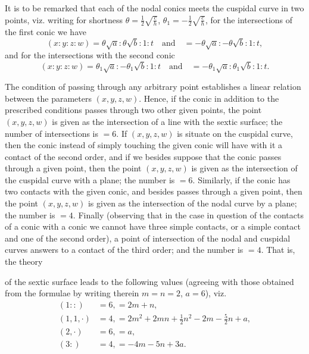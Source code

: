 \documentclass[12pt,a4paper]{article}
\begin{document}
It is to be remarked that each of the nodal conics meets the cuspidal curve in two points, viz. writing for shortness $\theta = \tfrac{1}{2}\sqrt{\tfrac{c}{h}}$, $\theta_1 = -\tfrac{1}{2}\sqrt{\tfrac{c}{h}}$, for the intersections of the first conic we have
\[
(x : y : z : w) = \theta\sqrt{a} : \theta\sqrt{b} : 1 : t \quad\text{and}\quad = -\theta\sqrt{a} : -\theta\sqrt{b} : 1 : t,
\]
and for the intersections with the second conic
\[
(x : y : z : w) = \theta_1\sqrt{a} : -\theta_1\sqrt{b} : 1 : t \quad\text{and}\quad = -\theta_1\sqrt{a} : \theta_1\sqrt{b} : 1 : t.
\]

The condition of passing through any arbitrary point establishes a linear relation between the parameters $(x, y, z, w)$. Hence, if the conic in addition to the prescribed conditions passes through two other given points, the point $(x, y, z, w)$ is given as the intersection of a line with the sextic surface; the number of intersections is $= 6$. If $(x, y, z, w)$ is situate on the cuspidal curve, then the conic instead of simply touching the given conic will have with it a contact of the second order, and if we besides suppose that the conic passes through a given point, then the point $(x, y, z, w)$ is given as the intersection of the cuspidal curve with a plane; the number is $= 6$. Similarly, if the conic has two contacts with the given conic, and besides passes through a given point, then the point $(x, y, z, w)$ is given as the intersection of the nodal curve by a plane; the number is $= 4$. Finally (observing that in the case in question of the contacts of a conic with a conic we cannot have three simple contacts, or a simple contact and one of the second order), a point of intersection of the nodal and cuspidal curves answers to a contact of the third order; and the number is $= 4$. That is, the theory

of the sextic surface leads to the following values (agreeing with those obtained from the formulae by writing therein $m = n = 2$, $a = 6$), viz.
\begin{align*}
(1 ::) &= 6, = 2m + n,\\
(1, 1, \cdot) &= 4, = 2m^2 + 2mn + \tfrac{1}{2}n^2 - 2m - \tfrac{5}{2}n + a,\\
(2, \cdot) &= 6, = a,\\
(3 :) &= 4, = -4m - 5n + 3a.
\end{align*}
\end{document}
